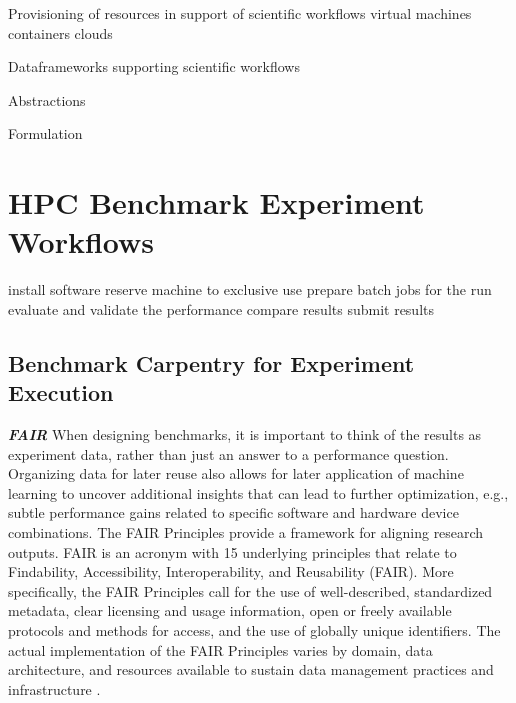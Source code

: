 \documentclass[utf8]{FrontiersinVancouver} %
\begin{document}
Provisioning of resources in support of scientific workflows
    virtual machines
    containers
    clouds

Dataframeworks supporting scientific workflows

Abstractions

Formulation








\section{HPC Benchmark  Experiment Workflows}

install software
reserve machine to exclusive use
prepare batch jobs for the run
evaluate and validate the performance
compare results
submit results




\subsection{Benchmark Carpentry for Experiment Execution}

\textbf{\textit{FAIR}}
When designing benchmarks, it is important to think of the results as experiment data, rather than just an answer to a performance question. Organizing data for later reuse also allows for later application of machine learning to uncover additional insights that can lead to further optimization, e.g., subtle performance gains related to specific software and hardware device combinations. The FAIR Principles provide a framework for aligning research outputs. FAIR is an acronym with 15 underlying principles that relate to Findability, Accessibility, Interoperability, and Reusability (FAIR)\citep{wilkinson2016fair}. More specifically, the FAIR Principles call for the use of well-described, standardized metadata, clear licensing and usage information, open or freely available protocols and methods for access, and the use of globally unique identifiers. The actual implementation of the FAIR Principles varies by domain, data architecture, and resources available to sustain data management practices and infrastructure \citep{jacobsen2020fair}.
\end{document}

